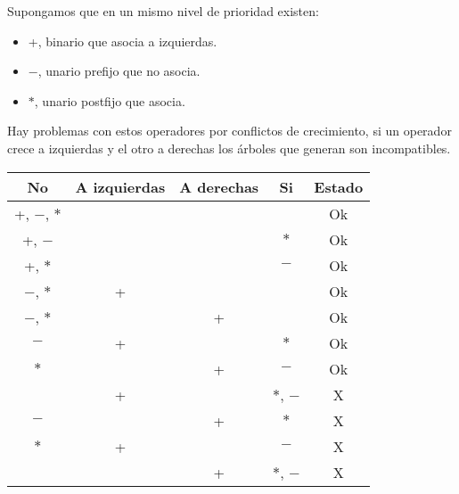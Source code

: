 \documentclass[\main/ApuntesPL.tex]{subfiles}
\begin{document}
      \bigskip
      \par
      Supongamos que en un mismo nivel de prioridad existen:
      \begin{itemize}
        \item +, binario que asocia a izquierdas.
        \item $-$, unario prefijo que no asocia.
        \item $\ast$, unario postfijo que asocia.
      \end{itemize}
      Hay problemas con estos operadores por conflictos de crecimiento, si un operador crece a
      izquierdas y el otro a derechas los árboles que generan son incompatibles.
      \begin{center}
        \begin{tabular}{||c c c c c||}
          \hline
          No & A izquierdas & A derechas & Si & Estado \\ [0.5ex]
          \hline\hline
          +, $-$, $\ast$ &  &  &  & Ok \\
          \hline
          +, $-$ &  &  & $\ast$ & Ok \\
          \hline
          +, $\ast$ &  &  & $-$ & Ok \\
          \hline
          $-$, $\ast$ & + &  &  & Ok \\
          \hline
          $-$, $\ast$ &  & + &  &  Ok \\
          \hline
          $-$ & + &  & $\ast$ & Ok \\
          \hline
          $\ast$ &  & + & $-$ & Ok \\
          \hline
          & + &  & $\ast$, $-$ & X \\
          \hline
          $-$ &  & + & $\ast$ & X \\
          \hline
          $\ast$ & + &  & $-$ & X \\
          \hline
          &  & + & $\ast$, $-$ & X \\ [1ex]
          \hline
        \end{tabular}
      \end{center}
\end{document}
